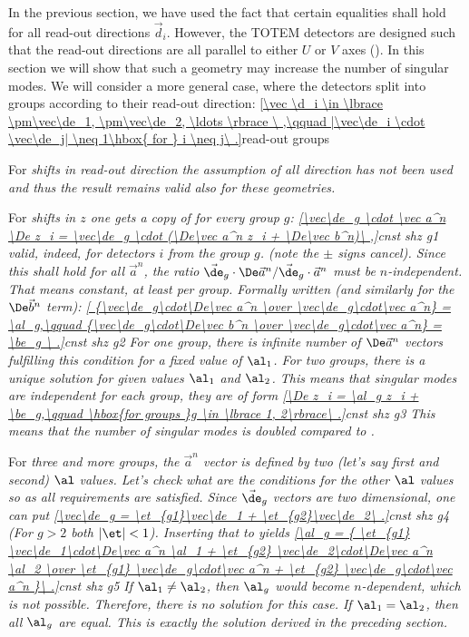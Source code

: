 
In the previous section, we have used the fact that certain equalities shall hold for all read-out directions $\vec d_i$. However, the TOTEM detectors are designed such that the read-out directions are all parallel to either $U$ or $V$ axes (). In this section we will show that such a geometry may increase the number of singular modes. We will consider a more general case, where the detectors split into groups according to their read-out direction:
\eqref{\vec \d_i \in \lbrace \pm\vec\de_1, \pm\vec\de_2, \ldots \rbrace \ ,\qquad |\vec\de_i \cdot \vec\de_j| \neq 1\hbox{ for } i \neq j\ .}{read-out groups}

For \em{shifts in read-out direction} the assumption of all direction has not been used and thus the result  remains valid also for these geometries.

For \em{shifts in $z$} one gets a copy of  for every group $g$:
\eqref{\vec\de_g \cdot \vec a^n \De z_i = \vec\de_g \cdot (\De\vec a^n z_i + \De\vec b^n)\ ,}{cnst shz g1}
valid, indeed, for detectors $i$ from the group $g$. (note the $\pm$ signs cancel). Since this shall hold for all $\vec a^n$, the ratio $\vec\de_g\cdot\De\vec a^n / \vec\de_g\cdot\vec a^n$ must be $n$-independent. That means constant, at least per group. Formally written (and similarly for the $\De\vec b^n$ term):
\eqref{
{\vec\de_g\cdot\De\vec a^n \over \vec\de_g\cdot\vec a^n} = \al_g,\qquad
{\vec\de_g\cdot\De\vec b^n \over \vec\de_g\cdot\vec a^n} = \be_g
\ .}{cnst shz g2}
For \em{one group}, there is infinite number of $\De\vec a^n$ vectors fulfilling this condition for a fixed value of $\al_1$. For \em{two groups}, there is a unique solution for given values $\al_1$ and $\al_2$. This means that singular modes are independent for each group, they are of form
\eqref{\De z_i = \al_g z_i + \be_g,\qquad \hbox{for groups }g \in \lbrace 1, 2\rbrace\ .}{cnst shz g3}
This means that the number of singular modes is doubled compared to .

For \em{three and more groups}, the $\vec a^n$ vector is defined by two (let's say first and second) $\al$ values. Let's check what are the conditions for the other $\al$ values so as all requirements  are satisfied. Since $\vec\de_g$ vectors are two dimensional, one can put
\eqref{\vec\de_g = \et_{g1}\vec\de_1 + \et_{g2}\vec\de_2\ .}{cnst shz g4}
(For $g>2$ both $|\et| < 1$). Inserting that to  yields
\eqref{\al_g = {
\et_{g1} \vec\de_1\cdot\De\vec a^n \al_1 + \et_{g2} \vec\de_2\cdot\De\vec a^n \al_2
\over
\et_{g1} \vec\de_g\cdot\vec a^n + \et_{g2} \vec\de_g\cdot\vec a^n
}\ .}{cnst shz g5}
If $\al_1 \neq \al_2$, then $\al_g$ would become $n$-dependent, which is not possible. Therefore, there is no solution for this case. If $\al_1 = \al_2$, then all $\al_g$ are equal. This is exactly the solution  derived in the preceding section.

